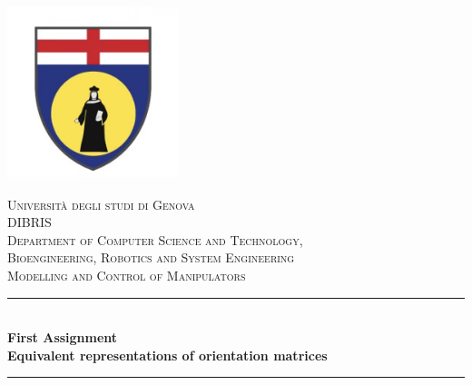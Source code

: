 \begin{titlepage}

\newcommand{\HRule}{\rule{\linewidth}{0.5mm}} %

\center
\includegraphics[width=5cm]{Title/Unige-logo.jpeg}\\[1cm] %
 

\center %


\textsc{\Huge Università degli studi di Genova}\\[1cm] %
\textsc{\LARGE DIBRIS}\\[0.3cm]
\textsc{\Small Department of Computer Science and Technology,}\\
\textsc{\Small Bioengineering, Robotics and System Engineering}\\[1cm] %
\textsc{\LARGE{Modelling and Control of Manipulators}}\\[1cm] %

\makeatletter
\HRule \\[0.4cm]
{ \huge \bfseries First Assignment}\\[0.2cm] 
{\Large \bfseries Equivalent representations of orientation matrices}\\
\HRule \\[1.5cm]
 

\end{titlepage}
